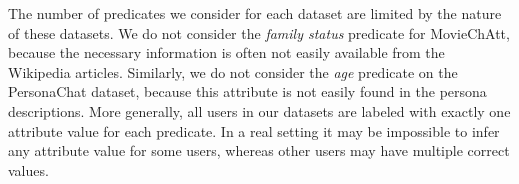  The number of predicates we consider for each dataset are limited by the nature of these datasets. We do not consider the \textit{family status} predicate for MovieChAtt, because the necessary information is often not easily available from the Wikipedia articles. Similarly, we do not consider the \textit{age} predicate on the PersonaChat dataset, because this attribute is not easily found in the persona descriptions. More generally, all users in our datasets are labeled with exactly one attribute value for each predicate. In a real setting it may be impossible to infer any attribute value for some users, whereas other users may have multiple correct values.


